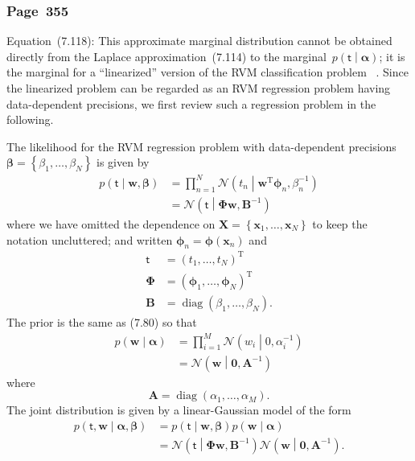 \documentclass[12pt,a4paper]{article}
\newcommand{\erratum}[1]{%
\subsubsection*{#1}
\addcontentsline{toc}{subsection}{#1}}
\begin{document}
\erratum{Page~355}
Equation~(7.118):
This approximate marginal distribution cannot be obtained directly from
the Laplace approximation~(7.114) to
the marginal~$p\left(\bm{\mathsf{t}}\middle|\bm{\alpha}\right)$;
it is the marginal for a ``linearized'' version of the RVM classification problem~%
\citep{Tipping:fast}.
Since the linearized problem can be regarded as
an RVM regression problem having data-dependent precisions,
we first review such a regression problem in the following.

The likelihood for the RVM regression problem with
data-dependent precisions~$\bm{\beta} = \left\{ \beta_1, \dots, \beta_N \right\}$ is given by
\begin{align}
p \left( \bm{\mathsf{t}} \middle| \mathbf{w}, \bm{\beta} \right)
&= \prod_{n=1}^{N}
\mathcal{N} \left( t_n \middle| \mathbf{w}^{\operatorname{T}} \bm{\phi}_n, \beta_n^{-1} \right) \\
&= \mathcal{N} \left( \bm{\mathsf{t}} \middle| \bm{\Phi}\mathbf{w}, \mathbf{B}^{-1} \right)
\end{align}
where we have omitted the dependence on
$\mathbf{X} = \left\{ \mathbf{x}_1, \dots, \mathbf{x}_N \right\}$
to keep the notation uncluttered;
and written $\bm{\phi}_n = \bm{\phi} \left(\mathbf{x}_n\right)$ and
\begin{align}
\bm{\mathsf{t}} &= \left( t_1, \dots, t_N \right)^{\operatorname{T}} \\
\bm{\Phi} &= \left( \bm{\phi}_1, \dots, \bm{\phi}_N \right)^{\operatorname{T}} \\
\mathbf{B} &= \operatorname{diag} \left( \beta_1, \dots, \beta_N \right) .
\end{align}
The prior is the same as (7.80) so that
\begin{align}
p \left( \mathbf{w} \middle| \bm{\alpha} \right)
&= \prod_{i = 1}^{M} \mathcal{N} \left( w_i \middle| 0, \alpha_i^{-1} \right) \\
&= \mathcal{N} \left( \mathbf{w} \middle| \mathbf{0}, \mathbf{A}^{-1} \right)
\end{align}
where
\begin{equation}
\mathbf{A} = \operatorname{diag} \left( \alpha_1, \dots, \alpha_M \right) .
\end{equation}
The joint distribution is given by a linear-Gaussian model of the form
\begin{align}
p \left( \bm{\mathsf{t}}, \mathbf{w} \middle| \bm{\alpha}, \bm{\beta} \right)
&= p \left( \bm{\mathsf{t}} \middle| \mathbf{w}, \bm{\beta} \right)
p \left( \mathbf{w} \middle| \bm{\alpha} \right) \\
&= \mathcal{N} \left( \bm{\mathsf{t}} \middle| \bm{\Phi}\mathbf{w}, \mathbf{B}^{-1} \right)
\mathcal{N} \left( \mathbf{w} \middle| \mathbf{0}, \mathbf{A}^{-1} \right) .
\end{align}
\end{document}

